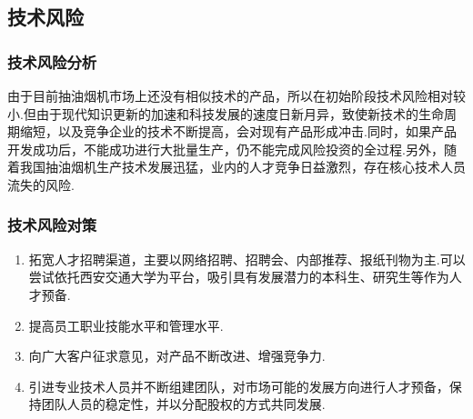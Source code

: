 \subsection{技术风险}
\subsubsection{技术风险分析}
由于目前抽油烟机市场上还没有相似技术的产品，所以在初始阶段技术风险相对较小.但由于现代知识更新的加速和科技发展的速度日新月异，致使新技术的生命周期缩短，以及竞争企业的技术不断提高，会对现有产品形成冲击.同时，如果产品开发成功后，不能成功进行大批量生产，仍不能完成风险投资的全过程.另外，随着我国抽油烟机生产技术发展迅猛，业内的人才竞争日益激烈，存在核心技术人员流失的风险.

\subsubsection{技术风险对策}
\begin{enumerate}
\item 拓宽人才招聘渠道，主要以网络招聘、招聘会、内部推荐、报纸刊物为主.可以尝试依托西安交通大学为平台，吸引具有发展潜力的本科生、研究生等作为人才预备.
\item 提高员工职业技能水平和管理水平.
\item 向广大客户征求意见，对产品不断改进、增强竞争力.
\item 引进专业技术人员并不断组建团队，对市场可能的发展方向进行人才预备，保持团队人员的稳定性，并以分配股权的方式共同发展.
\end{enumerate}